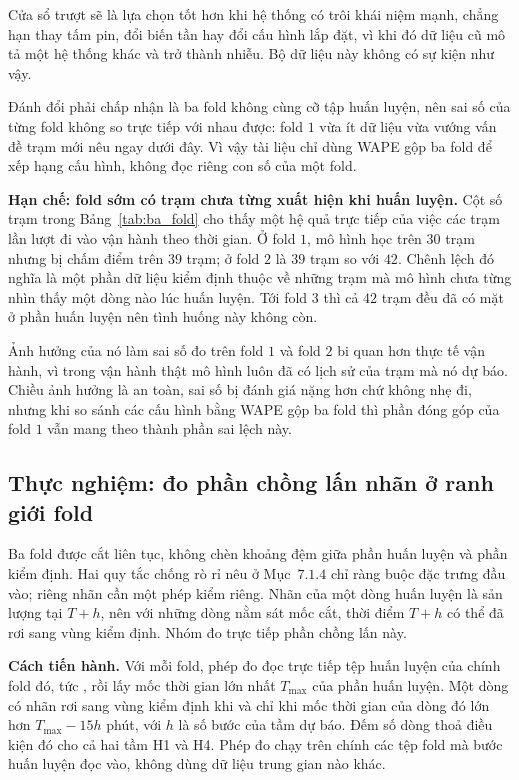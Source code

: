 Cửa sổ trượt sẽ là lựa chọn tốt hơn khi hệ thống có trôi khái niệm mạnh, chẳng hạn thay
tấm pin, đổi biến tần hay đổi cấu hình lắp đặt, vì khi đó dữ liệu cũ mô tả một hệ thống
khác và trở thành nhiễu. Bộ dữ liệu này không có sự kiện như vậy.

Đánh đổi phải chấp nhận là ba fold không cùng cỡ tập huấn luyện, nên sai số của từng fold
không so trực tiếp với nhau được: fold $1$ vừa ít dữ liệu vừa vướng vấn đề trạm mới nêu
ngay dưới đây. Vì vậy tài liệu chỉ dùng WAPE gộp ba fold để xếp hạng cấu hình, không đọc
riêng con số của một fold.

\textbf{Hạn chế: fold sớm có trạm chưa từng xuất hiện khi huấn luyện.} Cột số trạm trong
Bảng~\ref{tab:ba_fold} cho thấy một hệ quả trực tiếp của việc các trạm lần lượt đi vào vận
hành theo thời gian. Ở fold $1$, mô hình học trên $30$ trạm nhưng bị chấm điểm trên $39$
trạm; ở fold $2$ là $39$ trạm so với $42$. Chênh lệch đó nghĩa là một phần dữ liệu kiểm định
thuộc về những trạm mà mô hình chưa từng nhìn thấy một dòng nào lúc huấn luyện. Tới
fold $3$ thì cả $42$ trạm đều đã có mặt ở phần huấn luyện nên tình huống này không còn.

Ảnh hưởng của nó làm sai số đo trên fold $1$ và fold $2$ bi quan hơn thực tế vận
hành, vì trong vận hành thật mô hình luôn đã có lịch sử của trạm mà nó dự báo. Chiều ảnh
hưởng là an toàn, sai số bị đánh giá nặng hơn chứ không nhẹ đi, nhưng khi so sánh các
cấu hình bằng WAPE gộp ba fold thì phần đóng góp của fold $1$ vẫn mang theo thành phần sai
lệch này.

\FloatBarrier
\subsection{Thực nghiệm: đo phần chồng lấn nhãn ở ranh giới fold}

Ba fold được cắt liên tục, không chèn khoảng đệm giữa phần huấn luyện và phần kiểm
định. Hai quy tắc chống rò rỉ nêu ở Mục~$7.1.4$ chỉ ràng buộc đặc trưng đầu
vào; riêng nhãn cần một phép kiểm riêng. Nhãn của một dòng huấn luyện là sản
lượng tại $T + h$, nên với những dòng nằm sát mốc cắt, thời điểm $T + h$ có thể đã rơi
sang vùng kiểm định. Nhóm đo trực tiếp phần chồng lấn này.

\textbf{Cách tiến hành.} Với mỗi fold, phép đo đọc trực tiếp tệp huấn luyện của
chính fold đó, tức , rồi lấy mốc thời gian lớn nhất
$T_{\max}$ của phần huấn luyện. Một dòng có nhãn rơi sang vùng kiểm định khi và chỉ khi mốc thời gian của dòng đó lớn hơn
$T_{\max} - 15h$ phút, với $h$ là số bước của tầm dự báo. Đếm số dòng thoả điều kiện đó
cho cả hai tầm H1 và H4. Phép đo chạy trên chính các tệp fold mà bước huấn luyện đọc
vào, không dùng dữ liệu trung gian nào khác.

